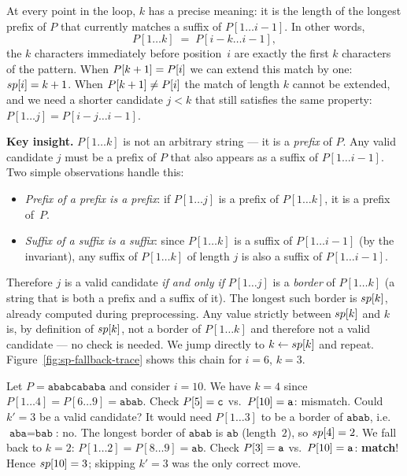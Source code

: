 \begin{remark}
  At every point in the loop, $k$ has a precise meaning: it is the length
  of the longest prefix of $P$ that currently matches a suffix of
  $P[1\ldots i{-}1]$.
  In other words,
  \[
    P[1\ldots k] \;=\; P[i-k\ldots i-1],
  \]
  the $k$ characters immediately before position~$i$ are exactly the first $k$
  characters of the pattern.
  When $P[k+1] = P\kern0pt[i]$ we can extend this match by one: $sp\kern0pt[i] = k+1$.
  When $P[k+1] \neq P\kern0pt[i]$ the match of length $k$ cannot be extended, and we
  need a shorter candidate $j < k$ that still satisfies the same property:
  $P[1\ldots j] = P[i-j\ldots i-1]$.

  \smallskip\noindent
  \textbf{Key insight.}
  $P[1\ldots k]$ is not an arbitrary string --- it is a \emph{prefix} of $P$.
  Any valid candidate $j$ must be a prefix of $P$ that also appears as a
  suffix of $P[1\ldots i{-}1]$.
  Two simple observations handle this:
  \begin{itemize}[noitemsep, topsep=2pt]
    \item \emph{Prefix of a prefix is a prefix}: if $P[1\ldots j]$ is a
          prefix of $P[1\ldots k]$, it is a prefix of~$P$.
    \item \emph{Suffix of a suffix is a suffix}: since $P[1\ldots k]$
          is a suffix of $P[1\ldots i{-}1]$ (by the invariant), any suffix of
          $P[1\ldots k]$ of length $j$ is also a suffix of $P[1\ldots i{-}1]$.
  \end{itemize}
  Therefore $j$ is a valid candidate \emph{if and only if} $P[1\ldots j]$ is
  a \emph{border} of $P[1\ldots k]$ (a string that is both a prefix and a
  suffix of it).
  The longest such border is $sp\kern0pt[k]$, already computed during preprocessing.
  Any value strictly between $sp\kern0pt[k]$ and $k$ is, by definition of $sp\kern0pt[k]$,
  not a border of $P[1\ldots k]$ and therefore not a valid candidate --- no
  check is needed.
  We jump directly to $k \gets sp\kern0pt[k]$ and repeat.
  Figure~\ref{fig:sp-fallback-trace} shows this chain for $i=6$, $k=3$.
\end{remark}

\begin{note}
  Let $P = \texttt{ababcababa}$ and consider $i = 10$.
  We have $k = 4$ since $P[1\ldots 4] = P[6\ldots 9] = \texttt{abab}$.
  Check $P\kern0pt[5] = \texttt{c}$ vs.\ $P\kern0pt[10] = \texttt{a}$: mismatch.
  Could $k'=3$ be a valid candidate?
  It would need $P[1\ldots 3]$ to be a border of $\texttt{abab}$,
  i.e.\ $\texttt{aba} = \texttt{bab}$: no.
  The longest border of $\texttt{abab}$ is $\texttt{ab}$ (length~$2$), so $sp\kern0pt[4]=2$.
  We fall back to $k=2$: $P[1\ldots 2] = P[8\ldots 9] = \texttt{ab}$.
  Check $P\kern0pt[3] = \texttt{a}$ vs.\ $P\kern0pt[10] = \texttt{a}$: \textbf{match}!
  Hence $sp\kern0pt[10] = 3$; skipping $k'=3$ was the only correct move.
\end{note}

